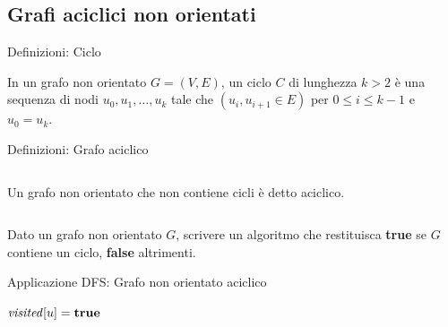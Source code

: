 \subsection{Grafi aciclici non orientati}

\begin{frame}{Definizioni: Ciclo}
	
\vspace{-6pt}
\begin{myboxtitle}
In un grafo non orientato $G=(V,E)$, un \alert{ciclo} $C$ di lunghezza $k > 2$ è una sequenza di nodi $u_0, u_1, \ldots, u_k$ tale che $(u_i, u_{i+1} \in E)$ per $0 \leq i \leq k-1$ e $u_0 = u_k$.
\end{myboxtitle}


\end{frame}


\begin{frame}{Definizioni: Grafo aciclico}

\vspace{-6pt}
\begin{columns}[T]

\begin{myboxtitle}
Un grafo non orientato che non contiene cicli è detto \alert{aciclico}.
\end{myboxtitle}
\vspace{-12pt}
\end{columns}

\bigskip
\begin{myboxtitle}[Problema]
Dato un grafo non orientato $G$, scrivere un algoritmo che restituisca \textbf{true} se $G$ contiene un ciclo, \textbf{false}
altrimenti.
\end{myboxtitle}

\end{frame}

\begin{frame}[shrink=10]{Applicazione DFS: Grafo non orientato aciclico}

\large
\begin{Procedure}
\caption[A]{$\BOOLEAN\ \textsf{hasCycleRec}(\Graph\ G,\ \Node\ u, \Node\ p, \BOOLEAN[\,]\ \mmark)$}

$\mmark[u] = \TRUE$\;
{
  \uIf{$\mmark[v]$}
  {
    \Return \TRUE\;
  }
  {
    \Return \TRUE\;
  }
}
\Return \FALSE\;
\end{Procedure}

\end{frame}

